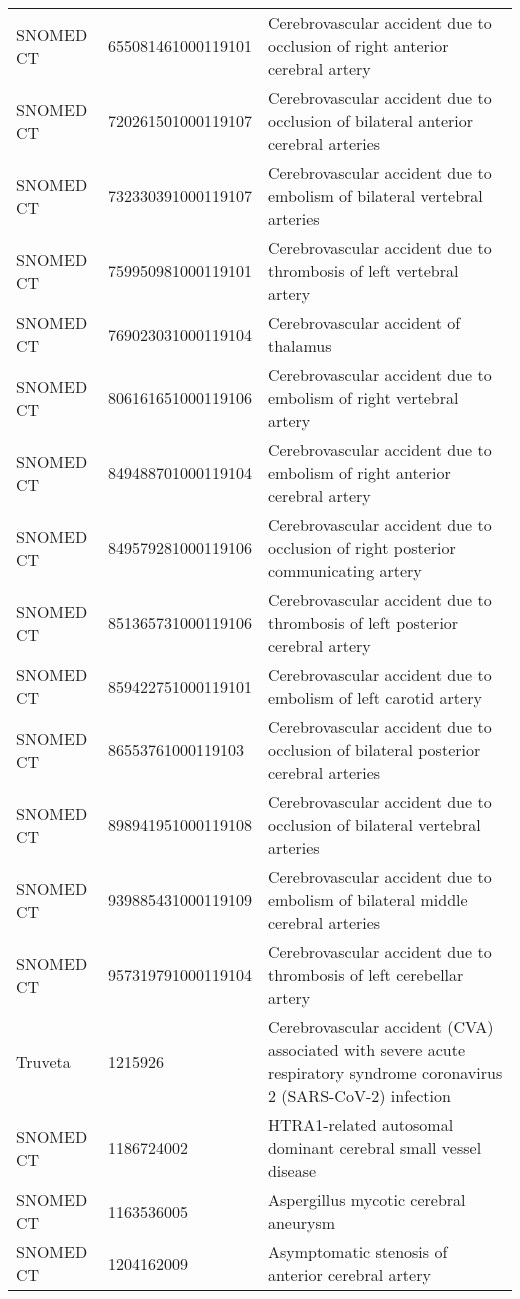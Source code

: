 \begin{longtable}{p{}p{}p{}}
  SNOMED CT & 655081461000119101 & Cerebrovascular accident due to occlusion of right anterior cerebral artery \\ 
  SNOMED CT & 720261501000119107 & Cerebrovascular accident due to occlusion of bilateral anterior cerebral arteries \\ 
  SNOMED CT & 732330391000119107 & Cerebrovascular accident due to embolism of bilateral vertebral arteries \\ 
  SNOMED CT & 759950981000119101 & Cerebrovascular accident due to thrombosis of left vertebral artery \\ 
  SNOMED CT & 769023031000119104 & Cerebrovascular accident of thalamus \\ 
  SNOMED CT & 806161651000119106 & Cerebrovascular accident due to embolism of right vertebral artery \\ 
  SNOMED CT & 849488701000119104 & Cerebrovascular accident due to embolism of right anterior cerebral artery \\ 
  SNOMED CT & 849579281000119106 & Cerebrovascular accident due to occlusion of right posterior communicating artery \\ 
  SNOMED CT & 851365731000119106 & Cerebrovascular accident due to thrombosis of left posterior cerebral artery \\ 
  SNOMED CT & 859422751000119101 & Cerebrovascular accident due to embolism of left carotid artery \\ 
  SNOMED CT & 86553761000119103 & Cerebrovascular accident due to occlusion of bilateral posterior cerebral arteries \\ 
  SNOMED CT & 898941951000119108 & Cerebrovascular accident due to occlusion of bilateral vertebral arteries \\ 
  SNOMED CT & 939885431000119109 & Cerebrovascular accident due to embolism of bilateral middle cerebral arteries \\ 
  SNOMED CT & 957319791000119104 & Cerebrovascular accident due to thrombosis of left cerebellar artery \\ 
  Truveta & 1215926 & Cerebrovascular accident (CVA) associated with severe acute respiratory syndrome coronavirus 2 (SARS-CoV-2) infection \\ 
  SNOMED CT & 1186724002 & HTRA1-related autosomal dominant cerebral small vessel disease \\ 
  SNOMED CT & 1163536005 & Aspergillus mycotic cerebral aneurysm \\ 
  SNOMED CT & 1204162009 & Asymptomatic stenosis of anterior cerebral artery \\ 

\end{longtable}
